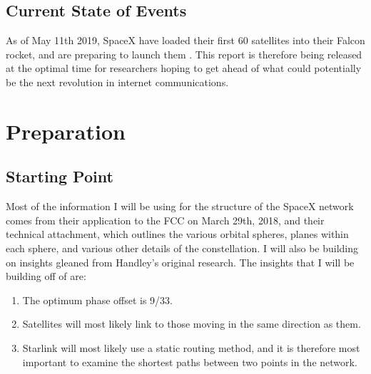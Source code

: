 \documentclass[12pt]{report}
\begin{document}
\section{Current State of Events}
As of May 11th 2019, SpaceX have loaded their first 60 satellites into their Falcon rocket, and are preparing to launch them \cite{ElonMuskTweet2}. This report is therefore being released at the optimal time for researchers hoping to get ahead of what could potentially be the next revolution in internet communications.

\chapter{Preparation}

\section{Starting Point}

Most of the information I will be using for the structure of the SpaceX network comes from their application to the FCC on March 29th, 2018\cite{FCCApplication}, and their technical attachment\cite{TechnicalAttachment}, which outlines the various orbital spheres, planes within each sphere, and various other details of the constellation. I will also be building on insights gleaned from Handley's original research. The insights that I will be building off of are:

\begin{enumerate}
\item The optimum phase offset is 9/33.
\item Satellites will most likely link to those moving in the same direction as them.
\item Starlink will most likely use a static routing method, and it is therefore most important to examine the shortest paths between two points in the network.
\end{enumerate}
\end{document}
